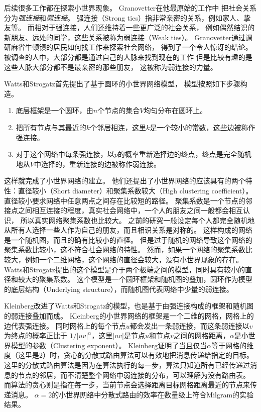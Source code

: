 后续很多工作都在探索小世界现象。
Granovetter在他最原始的工作中\cite{Granovetter1973strength,Granovetter1974getting}
把社会关系分为{\it 强连接}和{\it 弱连接}。
强连接（Strong ties）指非常亲密的关系，例如家人、挚友等。
而相对于强连接，人们还维持着一些更广泛的社会关系，
例如偶然结识的新朋友、远处的同学，这些关系被称为弱连接（Weak ties）。
Granovetter通过调研麻省牛顿镇的居民如何找工作来探索社会网络\cite{Granovetter1974getting}，
得到了一个令人惊讶的结论。
被调查的人中，大部分都是通过自己的人脉来找到现在的工作
但是比较有趣的是这些人脉大部分都不是最亲密的那些朋友，
这被称为弱连接的力量\cite{Granovetter1973strength}。

Watts和Strogatz首先提出了基于圆环的小世界网络模型\cite{Watts1998collective}，
模型按照如下步骤构造。
\begin{enumerate}
	\item 底层框架是一个圆环，由$n$个节点的集合$V$均匀分布在圆环上。
	\item 把所有节点与其最近的$k$个邻居相连，这里$k$是一个较小的常数，这些边被称作强连接。
	\item 对于这个网络中每条强连接，以$p$的概率重新选择边的终点，终点是完全随机地从$V$中选择的，重新连接的边被称作弱连接。
\end{enumerate}
这样就完成了小世界网络的建立。
他们还提出了小世界网络的应该具有的两个特性：直径较小（Short diameter）和聚集系数较大（High clustering coefficient）。
直径较小要求网络中任意两点之间存在比较短的路径。
聚集系数是一个节点的邻接点之间相互连接的程度，真实社会网络中，一个人的朋友之间一般都会相互认识，
所以真实网络聚集系数也比较大。
之前的研究\cite{de1978contacts}一般设定每个人都完全随机地从所有人选择一些人作为自己的朋友，而且相识关系是对称的。
这样构成的网络是一个随机图，而且的确有比较小的直径\cite{bollobas1998random}。
但是过于随机的网络导致这个网络的聚集系数比较小，这不符合社会网络的特性。
然而，如果一个网络的聚集系数比较大，例如一个二维网格，这个网络的直径会较大，没有小世界现象的存在。
Watts和Strogatz提出的这个模型是介于两个极端之间的模型，同时具有较小的直径和较大的聚集系数。
这个模型是一个圆环框架和随机图的叠加，圆环作为模型的底层结构（Underlying structure），而随机图代表网络中少量的弱连接。

Kleinberg改进了Watts和Strogatz的模型\cite{Kleinberg2000small}，也是基于由强连接构成的框架和随机图的弱连接叠加而成。
Kleinberg的小世界网络的框架是一个二维的网格，网格上的边代表强连接。
同时网格上的每个节点$u$都会发出一条弱连接，而这条弱连接以$v$为终点的概率正比于
$1/|uv|^{\alpha}$，这里$|uv|$是节点$u$和节点$v$之间的网格距离，$\alpha$是小世界模型的参数（Clustering exponent）。
Kleinberg证明了当且仅当$\alpha$等于网格的维度（这里是$2$）时，贪心的分散式路由算法可以有效地把消息传递给指定的目标\cite{Kleinberg2000small}。
这里的分散式路由算法是因为在算法执行的每一步，算法只知道所有已经传递过消息的节点的邻居，而不清楚整个网络中弱连接的分布，可以理解为没有路由表。
而算法的贪心则是指在每一步，当前节点会选择距离目标网格距离最近的节点来传递消息。
$\alpha=2$的小世界网络中分散式路由的效率在数量级上符合Milgram的实验结果。



